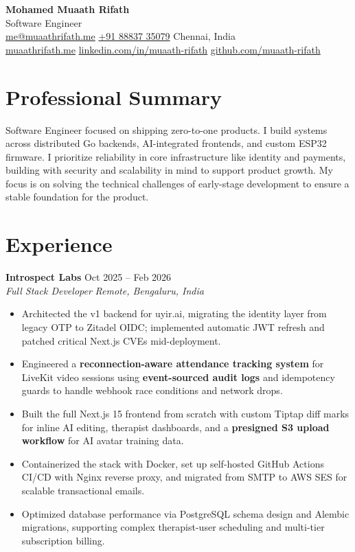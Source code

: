 \documentclass[10pt, letterpaper]{article}
\newcommand{\resumeEntry}[4]{
  \noindent\textbf{#1} \hfill #3 \\[-2pt]
  \textit{#2} \hfill \textit{#4}
}
\begin{document}
\begin{center}
  {\Large\bfseries Mohamed Muaath Rifath} \\[2pt]
  {\large Software Engineer} \\[2pt]
  {\small \href{mailto:me@muaathrifath.me}{me@muaathrifath.me} \enspace{\large\textbullet}\enspace \href{tel:+918883735079}{+91 88837 35079} \enspace{\large\textbullet}\enspace Chennai, India} \\[1pt]
  {\small \href{https://muaathrifath.me}{muaathrifath.me} \enspace{\large\textbullet}\enspace \href{https://linkedin.com/in/muaath-rifath}{linkedin.com/in/muaath-rifath} \enspace{\large\textbullet}\enspace \href{https://github.com/muaath-rifath}{github.com/muaath-rifath}}
\end{center}

\vspace{-8pt}

\section{Professional Summary}
{\small Software Engineer focused on shipping zero-to-one products. I build systems across distributed Go backends, AI-integrated frontends, and custom ESP32 firmware. I prioritize reliability in core infrastructure like identity and payments, building with security and scalability in mind to support product growth. My focus is on solving the technical challenges of early-stage development to ensure a stable foundation for the product.}

\vspace{1pt}

\section{Experience}
\resumeEntry{Introspect Labs}{Full Stack Developer}{Oct 2025 -- Feb 2026}{Remote, Bengaluru, India}
\begin{itemize}
  \item Architected the v1 backend for uyir.ai, migrating the identity layer from legacy OTP to Zitadel OIDC; implemented automatic JWT refresh and patched critical Next.js CVEs mid-deployment.
  \item Engineered a \textbf{reconnection-aware attendance tracking system} for LiveKit video sessions using \textbf{event-sourced audit logs} and idempotency guards to handle webhook race conditions and network drops.
  \item Built the full Next.js 15 frontend from scratch with custom Tiptap diff marks for inline AI editing, therapist dashboards, and a \textbf{presigned S3 upload workflow} for AI avatar training data.
  \item Containerized the stack with Docker, set up self-hosted GitHub Actions CI/CD with Nginx reverse proxy, and migrated from SMTP to AWS SES for scalable transactional emails.
  \item Optimized database performance via PostgreSQL schema design and Alembic migrations, supporting complex therapist-user scheduling and multi-tier subscription billing.
\end{itemize}
\end{document}
